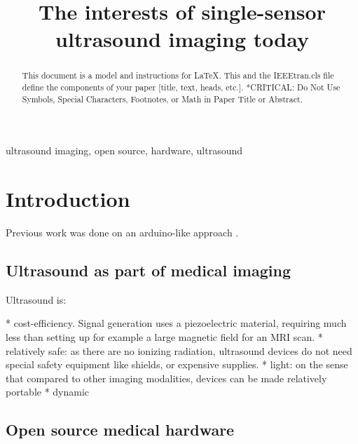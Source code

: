 \documentclass[conference]{IEEEtran}
\begin{document}
\title{The interests of single-sensor ultrasound imaging today}

\author{

}

\maketitle

\begin{abstract}
This document is a model and instructions for \LaTeX.
This and the IEEEtran.cls file define the components of your paper [title, text, heads, etc.]. *CRITICAL: Do Not Use Symbols, Special Characters, Footnotes, 
or Math in Paper Title or Abstract.
\end{abstract}

\begin{IEEEkeywords}
ultrasound imaging, open source, hardware, ultrasound
\end{IEEEkeywords}

\section{Introduction}


 
 
Previous work was done on an arduino-like approach \cite{jonveaux_arduino-like_2017}.

\subsection{Ultrasound as part of medical imaging }

Ultrasound is:

* cost-efficiency. Signal generation uses a piezoelectric material, requiring much less than setting up for example a large magnetic field for an MRI scan. 
* relatively safe: as there are no ionizing radiation, ultrasound devices do not need special safety equipment like shields, or expensive supplies.
* light: on the sense that compared to other imaging modalities, devices can be made relatively portable
* dynamic




\subsection{Open source medical hardware}
\end{document}
